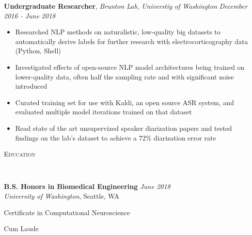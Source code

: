 \documentclass[9pt]{article}
\newenvironment{changemargin}[2]{%
  \begin{list}{}{%
    \setlength{\topsep}{0pt}%
    \setlength{\leftmargin}{#1}%
    \setlength{\rightmargin}{#2}%
    \setlength{\listparindent}{\parindent}%
    \setlength{\itemindent}{\parindent}%
    \setlength{\parsep}{\parskip}%
  }%
  \item[]}{\end{list}
}
\newcommand{\lineover}{
	\begin{changemargin}{-0.05in}{-0.05in}
		\vspace*{-8pt}
		\hrulefill \\
		\vspace*{-2pt}
	\end{changemargin}
}
\newcommand{\header}[1]{
	\begin{changemargin}{-0.5in}{-0.5in}
		\scshape{#1}\\
  	\lineover
	\end{changemargin}
}
\newcommand{\jobdescription}[1]{
	\begin{changemargin}{0.15in}{0.15in}
    \smallskip
		{#1}
    \medskip
	\end{changemargin}
}
\newcommand{\jobtitle}[3]{
	\textbf{#1}, \emph{#2} \hfill \emph{#3}\\
}
\newenvironment{body} {
	\vspace*{-16pt}
	\begin{changemargin}{-0.25in}{-0.5in}
  }	
	{\end{changemargin}
}
\begin{document}
\begin{body}
	
	\jobtitle{Undergraduate Researcher}{Brunton Lab, Universtiy of Washington}{December 2016 - June 2018}
	\jobdescription{
		\begin{itemize} \itemsep -0pt  %
			\item Researched NLP methods on naturalistic, low-quality big datasets to automatically derive labels for further research with electrocorticography data (Python, Shell)
			\item Investigated effects of open-source NLP model architectures being trained on lower-quality data, often half the sampling rate and with significant noise introduced
			\item Curated training set for use with Kaldi, an open source ASR system, and evaluated multiple model iterations trained on that dataset
			\item Read state of the art unsupervized speaker diarization papers and tested findings on the lab's dataset to achieve a 72\% diarization error rate
		\end{itemize}
	}
	
\end{body}

\medskip


\header{Education}

\begin{body}
	\vspace{14pt}
	\textbf{B.S. Honors in Biomedical Engineering} \hfill \emph{June 2018} \\
	\emph{University of Washington}, Seattle, WA \\
    \begin{changemargin}{0.15in}{0.15in}
        \begin{description} \itemsep -0pt  %
            \item Certificate in Computational Neuroscience
            \item Cum Laude
        \end{description}
    \end{changemargin}
\end{body}

\end{document}
